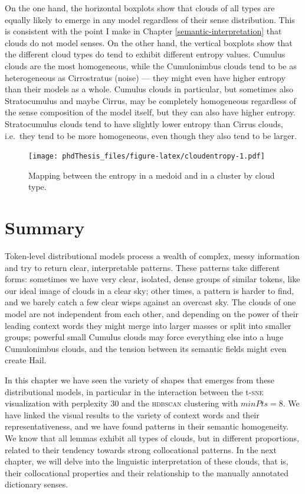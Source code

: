 \documentclass[
]{book}
\begin{document}
On the one hand, the horizontal boxplots show that clouds of all types are equally likely to emerge in any model regardless of their sense distribution. This is consistent with the point I make in Chapter \ref{semantic-interpretation} that clouds do not model senses. On the other hand, the vertical boxplots show that the different cloud types do tend to exhibit different entropy values. Cumulus clouds are the most homogeneous, while the Cumulonimbus clouds tend to be as heterogeneous as Cirrostratus (noise) --- they might even have higher entropy than their models as a whole. Cumulus clouds in particular, but sometimes also Stratocumulus and maybe Cirrus, may be completely homogeneous regardless of the sense composition of the model itself, but they can also have higher entropy. Stratocumulus clouds tend to have slightly lower entropy than Cirrus clouds, i.e.~they tend to be more homogeneous, even though they also tend to be larger.



\begin{figure}
\centering
\texttt{[image: phdThesis\_files/figure-latex/cloudentropy-1.pdf]}
\caption{\label{fig:cloudentropy}Mapping between the entropy in a medoid and in a cluster by cloud type.}
\end{figure}

\hypertarget{theo2-summary}{%
\section{Summary}\label{theo2-summary}}

Token-level distributional models process a wealth of complex, messy information and try to return clear, interpretable patterns. These patterns take different forms: sometimes we have very clear, isolated, dense groups of similar tokens, like our ideal image of clouds in a clear sky; other times, a pattern is harder to find, and we barely catch a few clear wisps against an overcast sky. The clouds of one model are not independent from each other, and depending on the power of their leading context words they might merge into larger masses or split into smaller groups; powerful small Cumulus clouds may force everything else into a huge Cumulonimbus clouds, and the tension between its semantic fields might even create Hail.

In this chapter we have seen the variety of shapes that emerges from these distributional models, in particular in the interaction between the t-\textsc{sne} visualization with perplexity 30 and the \textsc{hdbscan} clustering with \(minPts = 8\). We have linked the visual results to the variety of context words and their representativeness, and we have found patterns in their semantic homogeneity. We know that all lemmas exhibit all types of clouds, but in different proportions, related to their tendency towards strong collocational patterns. In the next chapter, we will delve into the linguistic interpretation of these clouds, that is, their collocational properties and their relationship to the manually annotated dictionary senses.
\end{document}
